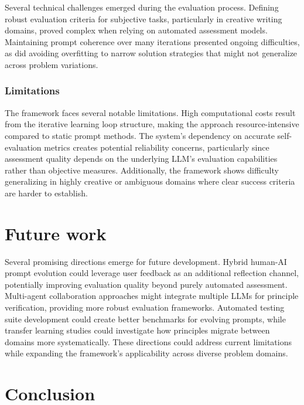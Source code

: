 \documentclass[10pt,a4paper,twocolumn]{article}
\begin{document}
Several technical challenges emerged during the evaluation process. Defining robust evaluation criteria for subjective tasks, particularly in creative writing domains, proved complex when relying on automated assessment models. Maintaining prompt coherence over many iterations presented ongoing difficulties, as did avoiding overfitting to narrow solution strategies that might not generalize across problem variations.


\subsubsection{Limitations}


The framework faces several notable limitations. High computational costs result from the iterative learning loop structure, making the approach resource-intensive compared to static prompt methods. The system's dependency on accurate self-evaluation metrics creates potential reliability concerns, particularly since assessment quality depends on the underlying LLM's evaluation capabilities rather than objective measures. Additionally, the framework shows difficulty generalizing in highly creative or ambiguous domains where clear success criteria are harder to establish.





\section{{Future work} }


Several promising directions emerge for future development. Hybrid human-AI prompt evolution could leverage user feedback as an additional reflection channel, potentially improving evaluation quality beyond purely automated assessment. Multi-agent collaboration approaches might integrate multiple LLMs for principle verification, providing more robust evaluation frameworks. \newline
Automated testing suite development could create better benchmarks for evolving prompts, while transfer learning studies could investigate how principles migrate between domains more systematically. These directions could address current limitations while expanding the framework's applicability across diverse problem domains.




\section{{Conclusion} }
\end{document}
